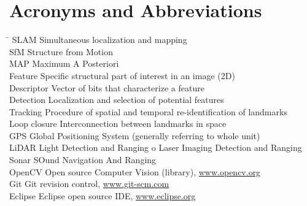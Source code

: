 \section*{Acronyms and Abbreviations}
\label{sec:acronyms}
\begin{tabbing}
	\hspace*{3.5cm}		\= \kill
	SLAM \> Simultaneous localization and mapping \\[1ex]
    SfM \> Structure from Motion \\[1ex]
    MAP \> Maximum A Posteriori \\[1ex]
	Feature \> Specific structural part of interest in an image (2D) \\[1ex]
	Descriptor \> Vector of bits that characterize a feature \\[1ex]
	Detection \> Localization and selection of potential features \\[1ex]
	Tracking \> Procedure of spatial and temporal re-identification of landmarks \\[1ex]
	Loop closure \> Interconnection between landmarks in space \\[1ex]
	GPS \> Global Positioning System (generally referring to whole unit) \\[1ex]
    LiDAR \> Light Detection and Ranging o Laser Imaging Detection and Ranging \\[1ex]
    Sonar \> SOund Navigation And Ranging \\[1ex]
	OpenCV  \> Open source Computer Vision (library), \url{www.opencv.org} \\[1ex]
	Git  \> Git revision control, \url{www.git-scm.com} \\[1ex]
	Eclipse \> Eclipse open source IDE, \url{www.eclipse.org}
\end{tabbing}